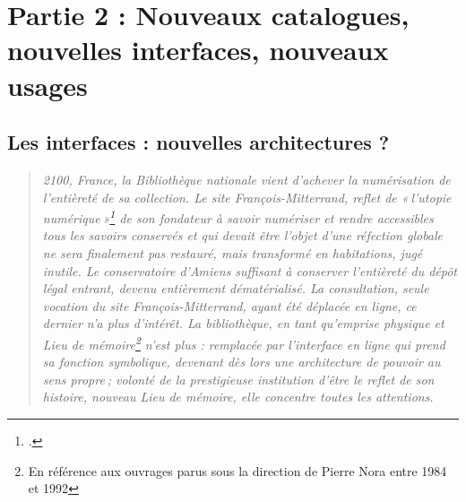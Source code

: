 


\part{Partie 2 : Nouveaux catalogues, nouvelles interfaces, nouveaux usages}




\chapter{Les interfaces : nouvelles architectures ?}
\begin{quote}
	\textit{2100, France, la Bibliothèque nationale vient d’achever la numérisation de l’entièreté de sa collection. Le site François-Mitterrand, reflet de « l’utopie numérique »\footcite[p. 20]{bermes2024} de son fondateur à savoir numériser et rendre accessibles tous les savoirs conservés et qui devait être l’objet d’une réfection globale ne sera finalement pas restauré, mais transformé en habitations, jugé inutile. Le conservatoire d’Amiens suffisant à conserver l’entièreté du dépôt légal entrant, devenu entièrement dématérialisé. La consultation, seule vocation du site François-Mitterrand, ayant été déplacée en ligne, ce dernier n'a plus d'intérêt. La bibliothèque, en tant qu’emprise physique et Lieu de mémoire\footnote{En référence aux ouvrages parus sous la direction de Pierre Nora entre 1984 et 1992} n’est plus : remplacée par l’interface en ligne qui prend sa fonction symbolique, devenant dès lors une architecture de pouvoir au sens propre ; volonté de la prestigieuse institution d’être le reflet de son histoire, nouveau Lieu de mémoire, elle concentre toutes les attentions.}
\end{quote}


